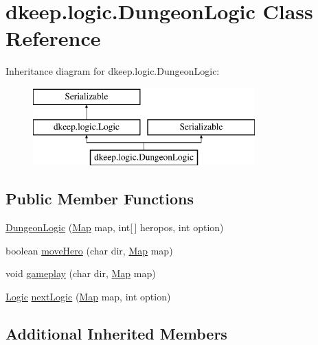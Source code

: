 \hypertarget{classdkeep_1_1logic_1_1_dungeon_logic}{}\section{dkeep.\+logic.\+Dungeon\+Logic Class Reference}
\label{classdkeep_1_1logic_1_1_dungeon_logic}
Inheritance diagram for dkeep.\+logic.\+Dungeon\+Logic\+:\begin{figure}[H]
\begin{center}
\leavevmode
\includegraphics[height=3.000000cm]{classdkeep_1_1logic_1_1_dungeon_logic}
\end{center}
\end{figure}
\subsection*{Public Member Functions}
\begin{DoxyCompactItemize}
\item 
\hyperlink{classdkeep_1_1logic_1_1_dungeon_logic_a705c692038bc3af07788e0091f9176b7}{Dungeon\+Logic} (\hyperlink{classdkeep_1_1logic_1_1_map}{Map} map, int\mbox{[}$\,$\mbox{]} heropos, int option)
\item 
boolean \hyperlink{classdkeep_1_1logic_1_1_dungeon_logic_a5560298a8a9e7831ce61a8cc1a7bc7c4}{move\+Hero} (char dir, \hyperlink{classdkeep_1_1logic_1_1_map}{Map} map)
\item 
void \hyperlink{classdkeep_1_1logic_1_1_dungeon_logic_a94e25841318f6c9f82bd7f1654b7368a}{gameplay} (char dir, \hyperlink{classdkeep_1_1logic_1_1_map}{Map} map)
\item 
\hyperlink{classdkeep_1_1logic_1_1_logic}{Logic} \hyperlink{classdkeep_1_1logic_1_1_dungeon_logic_ae94692c5c7044d32f78d2e021b0a9513}{next\+Logic} (\hyperlink{classdkeep_1_1logic_1_1_map}{Map} map, int option)
\end{DoxyCompactItemize}
\subsection*{Additional Inherited Members}


